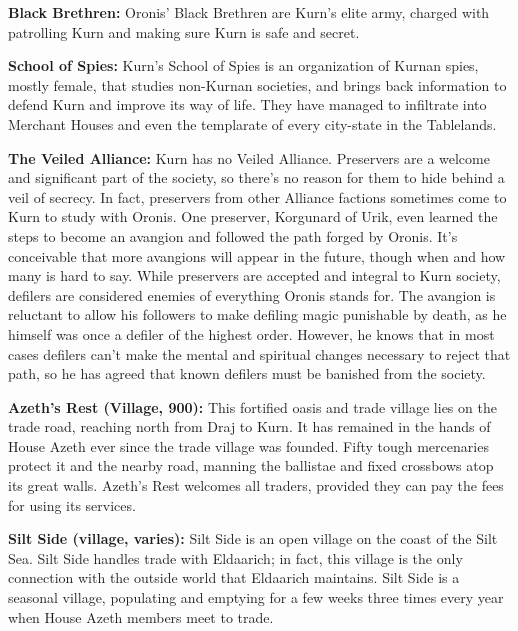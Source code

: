 {
	\textbf{Black Brethren:} Oronis' Black Brethren are Kurn's elite army, charged with patrolling Kurn and making sure Kurn is safe and secret.

	\textbf{School of Spies:} Kurn's School of Spies is an organization of Kurnan spies, mostly female, that studies non-Kurnan societies, and brings back information to defend Kurn and improve its way of life. They have managed to infiltrate into Merchant Houses and even the templarate of every city-state in the Tablelands.

	\textbf{The Veiled Alliance:} Kurn has no Veiled Alliance. Preservers are a welcome and significant part of the society, so there's no reason for them to hide behind a veil of secrecy. In fact, preservers from other Alliance factions sometimes come to Kurn to study with Oronis. One preserver, Korgunard of Urik, even learned the steps to become an avangion and followed the path forged by Oronis. It's conceivable that more avangions will appear in the future, though when and how many is hard to say. While preservers are accepted and integral to Kurn society, defilers are considered enemies of everything Oronis stands for. The avangion is reluctant to allow his followers to make defiling magic punishable by death, as he himself was once a defiler of the highest order. However, he knows that in most cases defilers can't make the mental and spiritual changes necessary to reject that path, so he has agreed that known defilers must be banished from the society.
}
{
	\textbf{Azeth's Rest (Village, 900):} This fortified oasis and trade village lies on the trade road, reaching north from Draj to Kurn. It has remained in the hands of House Azeth ever since the trade village was founded. Fifty tough mercenaries protect it and the nearby road, manning the ballistae and fixed crossbows atop its great walls. Azeth's Rest welcomes all traders, provided they can pay the fees for using its services.

	\textbf{Silt Side (village, varies):} Silt Side is an open village on the coast of the Silt Sea. Silt Side handles trade with Eldaarich; in fact, this village is the only connection with the outside world that Eldaarich maintains. Silt Side is a seasonal village, populating and emptying for a few weeks three times every year when House Azeth members meet to trade.
}
{}
